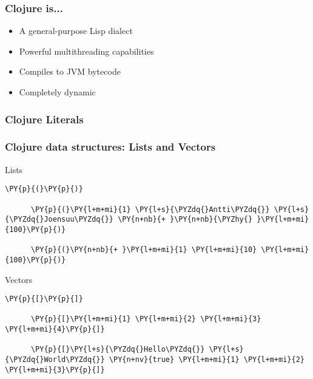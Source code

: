 \begin{frame}
  \frametitle{Clojure is...}


  \begin{itemize}[<+->]
    \item<1-> A general-purpose Lisp dialect
    \item<2-> Powerful multithreading capabilities
    \item<3-> Compiles to JVM bytecode
    \item<4-> Completely dynamic
  \end{itemize}
\end{frame}


\begin{frame}[fragile]
  \frametitle{Clojure Literals}

  
\end{frame}

\begin{frame}[fragile]
  \frametitle{Clojure data structures: Lists and Vectors}

  \begin{block}{Lists}
    \begin{Verbatim}[commandchars=\\\{\}]
      \PY{p}{(}\PY{p}{)}

      \PY{p}{(}\PY{l+m+mi}{1} \PY{l+s}{\PYZdq{}Antti\PYZdq{}} \PY{l+s}{\PYZdq{}Joensuu\PYZdq{}} \PY{n+nb}{+ }\PY{n+nb}{\PYZhy{} }\PY{l+m+mi}{100}\PY{p}{)}

      \PY{p}{(}\PY{n+nb}{+ }\PY{l+m+mi}{1} \PY{l+m+mi}{10} \PY{l+m+mi}{100}\PY{p}{)}
    \end{Verbatim}
  \end{block}

  \begin{block}{Vectors}
    \begin{Verbatim}[commandchars=\\\{\}]
      \PY{p}{[}\PY{p}{]}

      \PY{p}{[}\PY{l+m+mi}{1} \PY{l+m+mi}{2} \PY{l+m+mi}{3} \PY{l+m+mi}{4}\PY{p}{]}

      \PY{p}{[}\PY{l+s}{\PYZdq{}Hello\PYZdq{}} \PY{l+s}{\PYZdq{}World\PYZdq{}} \PY{n+nv}{true} \PY{l+m+mi}{1} \PY{l+m+mi}{2} \PY{l+m+mi}{3}\PY{p}{]}
    \end{Verbatim}
  \end{block}
\end{frame}


